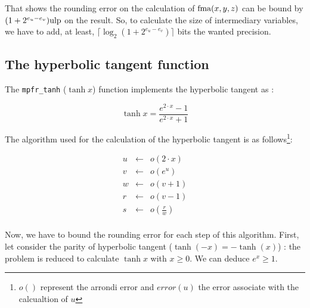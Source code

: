 \documentclass[12pt]{amsart}
\def\n{\textnormal}
\def\ulp{{\rm ulp}}
\begin{document}
That shows the rounding error on the calculation of $\n{fma}(x,y,z)$ can be
bound by $(1+2^{e_u-e_v}) \ulp$ on the result. So, to calculate the size of
intermediary variables, we have to add, at least, $\lceil \log_2 (1+2^{e_u-e_v})\rceil$ bits the wanted precision.

\subsection{The hyperbolic tangent function}

The {\tt mpfr\_tanh} ($\tanh{x}$) function implements the hyperbolic
tangent as :

$$
\tanh x = \frac{ e^{2 \cdot x} -1 }{ e^{2 \cdot x} +1} 
$$

The algorithm used for the calculation of the hyperbolic tangent is as follows\footnote{$o()$ represent the arrondi error and $error(u)$ the
  error associate with the calcualtion of $u$}:

\begin{eqnarray}\nonumber
u&\leftarrow&o(2 \cdot x)\\\label{tanhalgo1}
v&\leftarrow&o(e^u)\\\label{tanhalgo2}
w&\leftarrow&o(v+1)\\\label{tanhalgo3}
r&\leftarrow&o(v-1)\\\label{tanhalgo4}
s&\leftarrow&o(\frac{r}{w})\\\label{tanhalgo5}
\end{eqnarray}

Now, we have to bound the rounding error for each step of this
algorithm.  First, let consider the parity of hyperbolic tangent
($\tanh(-x)=-\tanh(x)$) : the problem is reduced to calculate $\tanh x$ with $x \geq 0$. We can deduce $e^x \geq 1$.
\end{document}
